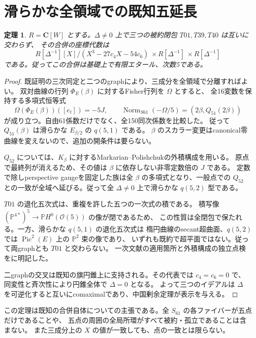 \documentclass[11pt,a4paper]{ltjsarticle}
\newcommand{\CC}{\mathbf C}
\newtheorem{theorem}{定理}[section]
\theoremstyle{remark}
\begin{document}
\section{滑らかな全領域での既知五延長}
\begin{theorem}\label{thm:known-five-smooth}
$R=\CC[W]$ とする。$\Delta\ne0$ 上で三つの被約閉包 $T01,T39,T40$ は互いに交わらず、
その合併の座標代数は
\[
 R[\Delta^{-1}][X]/(X^3-27c_4X-54c_6)
 \ \times R[\Delta^{-1}]\ \times R[\Delta^{-1}]
\]
である。従ってこの合併は基礎上で有限エタール、次数5である。
\end{theorem}
\begin{proof}
既証明の三次同定と二つのgraphにより、三成分を全領域で分離すればよい。
双対曲線の行列 $\Phi_E(\beta)$ に対するFisher行列を $\Omega$ とすると、
全16変数を保持する多項式恒等式
\[
 \Omega(\Phi_E(\beta))([e_t])=-5J,\qquad
 \operatorname{Norm}_{S61}(-\Omega/5)=(2\beta,Q_{51}(2\beta))
\]
が成り立つ。自由61係数だけでなく、全150同次係数を比較した\cite{known-five-v33}。
従って $Q_{51}(\beta)$ は滑らかな $E_{\beta/2}$ の $q(5,1)$ である。
$\beta$ のスカラー変更はcanonical零曲線を変えないので、追加の開条件は要らない。

$Q_{52}$ については、$K_\beta$ に対するMarkarian--Polishchukの外積構成を用いる。
原点で最終列が消えるため、その値は $\beta$ に依存しない非零定数倍の $J$ である。
定数で除しperspective gaugeを固定した族は全 $\beta$ の多項式となり、一般点での
$Q_{52}$ との一致が全域へ延びる。従って全 $\Delta\ne0$ 上で滑らかな $q(5,2)$ 型である。

$T01$ の退化五次式は、重複を許した五つの一次式の積である。
積写像 $(\mathbb P^{4*})^5\to\mathbb P H^0(\mathcal O(5))$ の像が閉であるため、
この性質は全閉包で保たれる。一方、滑らかな $q(5,1)$ の退化五次式は
楕円曲線のsecant超曲面、$q(5,2)$ では $\operatorname{Pic}^2(E)$ 上の $\mathbb P^2$ 束の像であり、
いずれも既約で超平面ではない。従って両graphとも $T01$ と交わらない。
一次文献の適用箇所と外積構成の独立点検を\cite{known-five-v33}に明記した。

二graphの交叉は既知の旗円錐上に支持される。その代表では $c_4=c_6=0$ で、
同変性と斉次性により円錐全体で $\Delta=0$ となる。
よって三つのイデアルは $\Delta$ を可逆化すると互いにcomaximalであり、中国剰余定理が表示を与える。
\end{proof}

この定理は既知の合併自体についての主張である。全 $S_{61}$ の各ファイバーが五点だけであることや、
五点の周囲の全局所環がすべて被約・孤立であることは含まない。
また三成分上の $X$ の値が一致しても、点の一致とは限らない。
\end{document}
